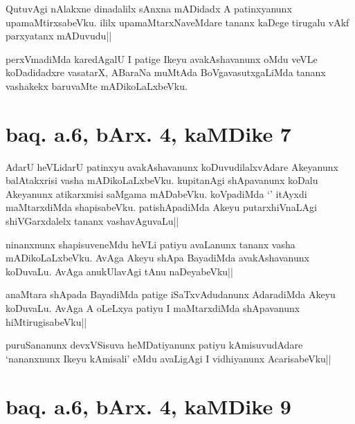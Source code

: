
\begin{artha}
QutuvAgi nAlakxne dinadalilx sAnxna mADidadx A patinxyanunx 
upamaMtirxsabeVku. ililx upamaMtarxNaveMdare tananx kaDege tirugalu 
vAkf parxyatanx mADuvudu||
\end{artha}

\begin{artha}
perxVmadiMda karedAgalU I patige Ikeyu avakAshavanunx oMdu veVLe 
koDadidadxre vasatarX, ABaraNa muMtAda BoVgavasutxgaLiMda tananx 
vashakekx baruvaMte mADikoLaLxbeVku.
\end{artha}

\section*{baq. a.6, bArx. 4, kaMDike 7}

\stext

\begin{artha}
AdarU heVLidarU patinxyu avakAshavanunx koDuvudilalxvAdare Akeyanunx 
balAtakxrisi vasha mADikoLaLxbeVku. kupitanAgi shApavanunx koDalu 
Akeyanunx atikarxmisi saMgama mADabeVku. koVpadiMda `\stext' itAyxdi 
maMtarxdiMda shapisabeVku. patishApadiMda Akeyu putarxhiVnaLAgi 
shiVGarxdalelx tananx vashavAguvaLu||
\end{artha}

\begin{artha}
ninanxnunx shapisuveneMdu heVLi patiyu avaLanunx tananx vasha 
mADikoLaLxbeVku. AvAga Akeyu shApa BayadiMda avakAshavanunx koDuvaLu. 
AvAga anukUlavAgi tAnu naDeyabeVku||
\end{artha}


\begin{artha}
anaMtara shApada BayadiMda patige iSaTxvAdudanunx AdaradiMda Akeyu 
koDuvaLu. AvAga A oLeLxya patiyu I maMtarxdiMda shApavanunx 
hiMtirugisabeVku||
\end{artha}


\begin{artha}
puruSananunx devxVSisuva heMDatiyanunx patiyu kAmisuvudAdare 
`nananxnunx Ikeyu kAmisali' eMdu avaLigAgi I vidhiyanunx AcarisabeVku||
\end{artha}

\section*{baq. a.6, bArx. 4, kaMDike 9}

